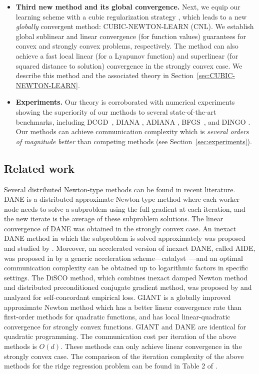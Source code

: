 \documentclass[10pt]{article}
\begin{document}
\begin{itemize}
\item {\bf Third new method and its global convergence.} Next, we equip our learning scheme with a  cubic regularization strategy \citep{Griewank-cubic-1981, PN2006-cubic}, which  leads to a new {\em globally} convergent method: {\sf CUBIC-NEWTON-LEARN (CNL)}. We establish global sublinear and linear convergence (for function values) guarantees for convex and strongly convex problems, respectively. The method can also achieve a fast local linear (for a Lyapunov function) and superlinear (for squared distance to solution) convergence in the strongly convex case.  We describe this method and the associated theory in Section~\ref{sec:CUBIC-NEWTON-LEARN}.


\item {\bf Experiments.} Our theory is corroborated with numerical experiments showing the superiority of our methods to several state-of-the-art benchmarks, including DCGD~\citep{KFJ}, DIANA \citep{DIANA, DIANA2}, ADIANA \citep{ADIANA}, BFGS~\cite{Broyden1967, Fletcher1970, Goldfarb1970, shanno1970conditioning}, and DINGO \citep{DINGO2019}.  Our methods can achieve communication complexity which is {\em several orders of magnitude better} than  competing methods (see Section~\ref{sec:experiments}).
\end{itemize}






\subsection{Related work}

Several distributed Newton-type methods can be found in recent literature. DANE \citep{DANE} is a distributed approximate Newton-type method where each worker node needs to solve a subproblem using the full gradient at each iteration, and the new iterate is the average of these subproblem solutions. The linear convergence of DANE was obtained in the strongly convex case. An inexact DANE method in which the subproblem is solved approximately was proposed and studied by \citet{AIDE}. Moreover, an accelerated version of inexact DANE, called AIDE, was proposed in  \citep{AIDE} by a generic acceleration scheme---catalyst~\citep{lin2015universal}---and an optimal communication complexity can be obtained up to logarithmic factors in specific settings. The DiSCO method, which combines inexact damped Newton method and distributed preconditioned conjugate gradient method, was proposed by \citet{DISCO} and analyzed for self-concordant empirical loss. GIANT \citep{GIANT2018} is a globally improved approximate Newton method which has a better linear convergence rate than first-order methods for quadratic functions, and has local linear-quadratic convergence for strongly convex functions. GIANT and DANE are identical for quadratic programming. The communication cost per iteration of the above methods is $O(d)$. These methods can only achieve linear convergence in the strongly convex case. The comparison of the iteration complexity of the above methods for the ridge regression problem can be found in Table 2 of \citep{GIANT2018}. 
\end{document}
